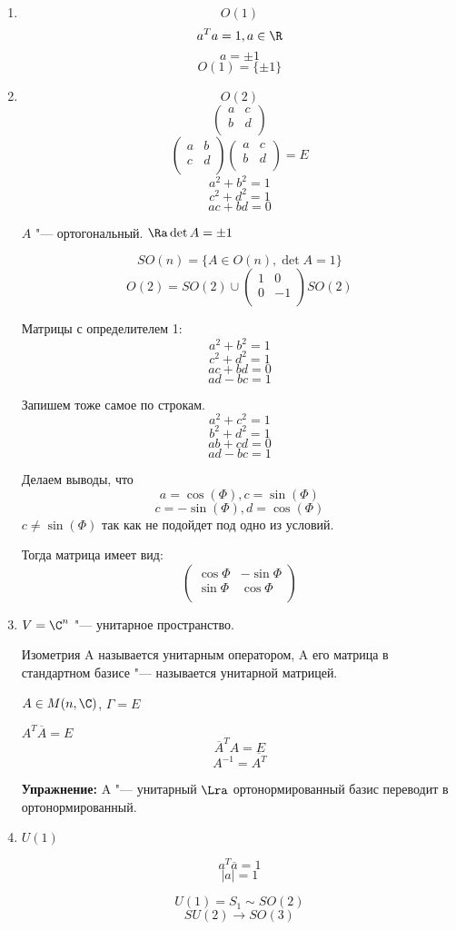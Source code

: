 \begin{exmp}
\begin{enumerate}
\item 
$$O(1)$$
$$a^{T}a = 1, a \in \R$$
$$a = \pm 1 $$
$$O(1) = \{\pm 1\} $$
\item 
$$O(2)$$
$$\begin{pmatrix} a&c\\ b&d\\ \end{pmatrix}$$
$$\begin{pmatrix} a&b\\ c&d\\ \end{pmatrix} \begin{pmatrix} a&c\\ b&d\\ \end{pmatrix} = E$$
$$a^2 + b^2 = 1$$
$$c^2 + d^2 = 1$$
$$ac + bd = 0$$

$A$ "--- ортогональный.
$\Ra \det A = \pm 1$


$$SO(n) = \{ A \in O(n), \det A = 1\} $$
$$O(2) = SO(2) \cup \begin{pmatrix} 1 & 0 \\  0& -1\\ \end{pmatrix} SO(2)$$


Матрицы с определителем 1:
$$a^2 + b^2 = 1$$
$$c^2 + d^2 = 1$$
$$ac + bd = 0$$
$$ad  - bc = 1$$

Запишем тоже самое по строкам. 
$$a^2 + c^2 = 1$$
$$b^2 + d^2 = 1$$
$$ab + cd = 0$$
$$ad  - bc = 1$$

Делаем выводы, что 
$$a = \cos(\Phi), c = \sin(\Phi)$$
$$c = -\sin(\Phi), d = \cos(\Phi)$$
$c \ne \sin(\Phi)$ так как не подойдет под одно из условий. 


Тогда матрица имеет вид:
$$
\begin{pmatrix}
\cos \Phi & -\sin \Phi\\
\sin \Phi & \cos \Phi\\
\end{pmatrix}
$$

\item 
$V = \C^n$ "--- унитарное пространство.

Изометрия A называется  унитарным оператором, A его матрица в стандартном базисе "--- называется унитарной матрицей. 

$A \in M(n, \C)$, $\Gamma = E$

$A^{T}\overline{A} = E$
$$\overline{A}^TA = E$$
$$A^{-1} = \overline{A^T}$$

\textbf{Упражнение:} A "--- унитарный $\Lra$ ортонормированный базис переводит в ортонормированный.

\item 
$U(1)$

$$a^{T}\overline{a} = 1$$
$$|a| = 1$$

$$U(1) = S_1 \sim SO(2)$$
$$SU(2) \to SO(3) $$

\end{enumerate}
\end{exmp} 
